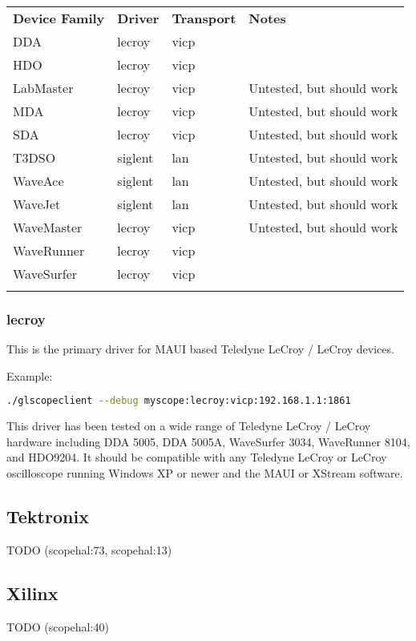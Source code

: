 \begin{tabularx}{16cm}{lllX}
\thickhline
\textbf{Device Family} & \textbf{Driver} & \textbf{Transport} & \textbf{Notes} \\
\thickhline
DDA & lecroy & vicp & \\
\thickhline
HDO & lecroy & vicp & \\
\thickhline
LabMaster & lecroy & vicp & Untested, but should work\\
\thickhline
MDA & lecroy & vicp & Untested, but should work\\
\thickhline
SDA & lecroy & vicp & Untested, but should work\\
\thickhline
T3DSO & siglent & lan & Untested, but should work\\
\thickhline
WaveAce & siglent & lan & Untested, but should work \\
\thickhline
WaveJet & siglent & lan & Untested, but should work \\
\thickhline
WaveMaster & lecroy & vicp & Untested, but should work \\
\thickhline
WaveRunner & lecroy & vicp & \\
\thickhline
WaveSurfer & lecroy & vicp & \\
\thickhline
\end{tabularx}

\subsubsection{lecroy}

This is the primary driver for MAUI based Teledyne LeCroy / LeCroy devices.

Example:
\begin{lstlisting}[language=sh]
./glscopeclient --debug myscope:lecroy:vicp:192.168.1.1:1861
\end{lstlisting}

This driver has been tested on a wide range of Teledyne LeCroy / LeCroy hardware including DDA 5005, DDA 5005A,
WaveSurfer 3034, WaveRunner 8104, and HDO9204. It should be compatible with any Teledyne LeCroy or LeCroy oscilloscope
running Windows XP or newer and the MAUI or XStream software.

\subsection{Tektronix}
TODO (scopehal:73, scopehal:13)

\subsection{Xilinx}
TODO (scopehal:40)
